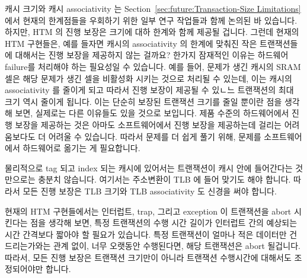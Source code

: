 캐시 크기와 캐시 associativity 는
Section~\ref{sec:future:Transaction-Size Limitations} 에서 현재의 한계점들을
우회하기 위한 일부 연구 작업들과 함께 논의된 바 있습니다.
하지만, HTM 의 진행 보장은 크기에 대하 한계와 함께 제공될 겁니다.
그런데 현재의 HTM 구현들은, 예를 들자면 캐시의 associativity 의 한계에 맞춰진
작은 트랜잭션들에 대해서는 진행 보장을 제공하지 않는 걸까요?
한가지 잠재적인 이유는 하드웨어 failure를 처리해야 하는 필요성일 수 있습니다.
예를 들어, 문제가 생긴 캐시의 SRAM 셀은 해당 문제가 생긴 셀을 비활성화 시키는
것으로 처리될 수 있는데, 이는 캐시의 associativity 를 줄이게 되고 따라서 진행
보장이 제공될 수 있ㄴ느 트랜잭션의 최대 크기 역시 줄이게 됩니다.
이는 단순히 보장된 트랜잭션 크기를 줄일 뿐이란 점을 생각해 보면, 실제로는 다른
이유들도 있을 것으로 보입니다.
제품 수준의 하드웨어에서 진행 보장을 제공하는 것은 아마도 소프트웨어에서 진행
보장을 제공하는데 걸리는 어려움보다도 더 어려울 수 있습니다.
따라서 문제를 더 쉽게 풀기 위해, 문제를 소프트웨어에서 하드웨어로 옮기는 게
필요합니다.
\iffalse

Cache size and associativity was discussed in
Section~\ref{sec:future:Transaction-Size Limitations},
along with some research intended to work around current limitations.
However, HTM forward-progress guarantees would
come with size limits, large though these limits might one day be.
So why don't current HTM implementations provide forward-progress
guarantees for small transactions, for example, limited to the
associativity of the cache?
One potential reason might be the need to deal with hardware failure.
For example, a failing cache SRAM cell might be handled by deactivating
the failing cell, thus reducing the associativity of the cache and
therefore also the maximum size of transactions that can be guaranteed
forward progress.
Given that this would simply decrease the guaranteed transaction size,
it seems likely that other reasons are at work.
Perhaps providing forward progress guarantees on production-quality
hardware is more difficult than one might think, an entirely plausible
explanation given the difficulty of making forward-progress guarantees
in software.
Moving a problem from software to hardware does not necessarily make
it easier to solve.
\fi

물리적으로 tag 되고 index 되는 캐시에 있어서는 트랜잭션이 캐시 안에 들어간다는
것만으로는 충분치 않습니다.
여기서는 주소변환이 TLB 에 들어 맞기도 해야 합니다.
따라서 모든 진행 보장은 TLB 크기와 TLB associativity 도 신경을 써야 합니다.

현재의 HTM 구현들에서는 인터럽트, trap, 그리고 exception 이 트랜잭션을 abort
시킨다는 점을 생각해 보면, 특정 트랜잭션의 수행 시간 길이가 인터럽트 간의
예상되는 시간 간격보다 짧아야 할 필요가 있습니다.
특정 트랜잭션이 얼마나 적은 데이터만 건드리는가와는 관계 없이, 너무 오랫동안
수행된다면, 해당 트랜잭션은 abort 될겁니다.
따라서, 모든 진행 보장은 트랜잭션 크기만이 아니라 트랜잭션 수행시간에 대해서도
조정되어야만 합니다.
\iffalse


